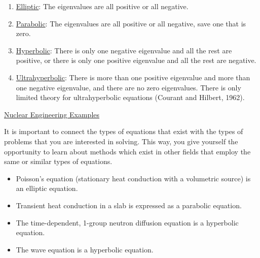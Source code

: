 \documentclass[12pt]{article}
\begin{document}
\begin{enumerate}
\item \underline{Elliptic}: The eigenvalues are all positive or all negative.
\item \underline{Parabolic}: The eigenvalues are all positive or all negative, 
      save one that is zero.
\item \underline{Hyperbolic}: There is only one negative eigenvalue and all 
      the rest are positive, or there is only one positive eigenvalue and all 
      the rest are negative.
\item \underline{Ultrahyperbolic}: There is more than one positive eigenvalue 
      and more than one negative eigenvalue, and there are no zero 
      eigenvalues. There is only limited theory for ultrahyperbolic equations
      (Courant and Hilbert, 1962).
\end{enumerate}

\underline{Nuclear Engineering Examples}

It is important to connect the types of equations that exist with the types of
problems that you are interested in solving. This way, you give yourself the
opportunity to learn about methods which exist in other fields that employ the
same or similar types of equations.

\begin{itemize}
\item{Poisson's equation (stationary heat conduction with a volumetric source)
      is an elliptic equation.}
\item{Transient heat conduction in a slab is expressed as a parabolic
      equation.}
\item{The time-dependent, 1-group neutron diffusion equation is a hyperbolic
      equation.}
\item{The wave equation is a hyperbolic equation.}
\end{itemize}

%
\end{document}
